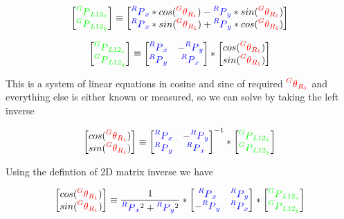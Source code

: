 \documentclass[12pt]{article}
\newcommand{\gxpy}[2]{{\color{green} \prescript{#1}{}{P}_{#2}}}
\newcommand{\bxpy}[2]{{\color{blue} \prescript{#1}{}{P}_{#2}}}
\newcommand{\rxoy}[2]{{\color{red} \prescript{#1}{}{\theta}_{#2}}}
\begin{document}
\[
\begin{bmatrix} \gxpy{G}{L12_{x}} \\ \gxpy{G}{L12_{y}} \end{bmatrix}
  \equiv
  \begin{bmatrix} \bxpy{R}{x} * cos(\rxoy{G}{R_1}) - \bxpy{R}{y} * sin(\rxoy{G}{R_1}) \\ \bxpy{R}{x} * sin(\rxoy{G}{R_1}) + \bxpy{R}{y} * cos(\rxoy{G}{R_1}) \end{bmatrix}
\]

\[
\begin{bmatrix} \gxpy{G}{L12_{x}} \\ \gxpy{G}{L12_{y}} \end{bmatrix}
  \equiv
  \begin{bmatrix} \bxpy{R}{x} & -\bxpy{R}{y} \\ \bxpy{R}{y} & \bxpy{R}{x} \end{bmatrix}
  *
  \begin{bmatrix} cos(\rxoy{G}{R_1}) \\ sin(\rxoy{G}{R_1}) \end{bmatrix}
\]

This is a system of linear equations in cosine and sine of required $ \rxoy{G}{R_1} $ and everything else is either known or measured, so we can solve by taking the left inverse

\[
\begin{bmatrix} cos(\rxoy{G}{R_1}) \\ sin(\rxoy{G}{R_1}) \end{bmatrix}
  \equiv
  \begin{bmatrix} \bxpy{R}{x} & -\bxpy{R}{y} \\ \bxpy{R}{y} & \bxpy{R}{x} \end{bmatrix}^{-1}
  *
  \begin{bmatrix} \gxpy{G}{L12_{x}} \\ \gxpy{G}{L12_{y}} \end{bmatrix}
\]

Using the defintion of 2D matrix inverse we have

\[
\begin{bmatrix} cos(\rxoy{G}{R_1}) \\ sin(\rxoy{G}{R_1}) \end{bmatrix}
  \equiv
  \frac{1}{\bxpy{R}{x}^2 + \bxpy{R}{y}^2}
  *
  \begin{bmatrix} \bxpy{R}{x} & \bxpy{R}{y} \\ -\bxpy{R}{y} & \bxpy{R}{x} \end{bmatrix}
  *
  \begin{bmatrix} \gxpy{G}{L12_{x}} \\ \gxpy{G}{L12_{y}} \end{bmatrix}
\]
\end{document}
